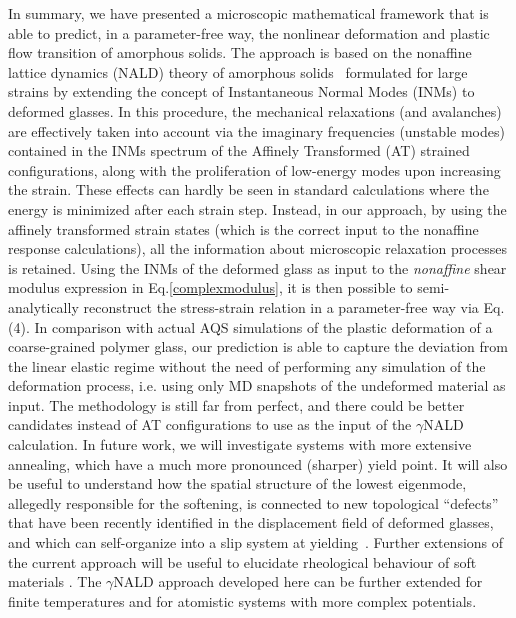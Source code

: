\documentclass[pre,twocolumn,aps,superscriptaddress,showpacs]{revtex4-1}
\begin{document}
In summary, we have presented a microscopic mathematical framework that is able to predict, in a parameter-free way, the nonlinear deformation and plastic flow transition of amorphous solids. 
The approach is based on the nonaffine lattice dynamics (NALD) theory of amorphous solids~\cite{Lemaitre2006,ZacconeScossa2011,Prediction2018,ElderACS} formulated for large strains by extending the concept of Instantaneous Normal Modes (INMs) to deformed glasses. In this procedure, the mechanical relaxations (and avalanches) are effectively taken into account via the imaginary frequencies (unstable modes) contained in the INMs spectrum of the Affinely Transformed (AT) strained configurations, along with the proliferation of low-energy modes upon increasing the strain. These effects can hardly be seen in standard calculations where the energy is minimized after each strain step. Instead, in our approach, by using the affinely transformed strain states (which is the correct input to the nonaffine response calculations), all the information about microscopic relaxation processes is retained.
Using the INMs of the deformed glass as input to the \emph{nonaffine} shear modulus expression in Eq.\eqref{complexmodulus}, it is then possible to semi-analytically reconstruct the stress-strain relation in a parameter-free way via Eq. (4). In comparison with actual AQS simulations of the plastic deformation of a coarse-grained polymer glass, our prediction is able to capture the deviation from the linear elastic regime without the need of performing any simulation of the deformation process, i.e. using only MD snapshots of the undeformed material as input. The methodology is still far from perfect, and there could be better candidates instead of AT configurations to use as the input of the $\gamma$NALD calculation.
In future work, we will investigate systems with more extensive annealing, which have a much more pronounced (sharper) yield point.
It will also be useful to understand how the spatial structure of the lowest eigenmode, allegedly responsible for the softening, is connected to new topological ``defects'' that have been recently identified in the displacement field of deformed glasses, and which can self-organize into a slip system at yielding~\cite{Matteo}. 
Further extensions of the current approach will be useful to elucidate rheological behaviour of soft materials \cite{Mizuno_INMs_Bulkley}.
The $\gamma$NALD approach developed here can be further extended for finite temperatures and for atomistic systems with more complex potentials. \\
\end{document}
